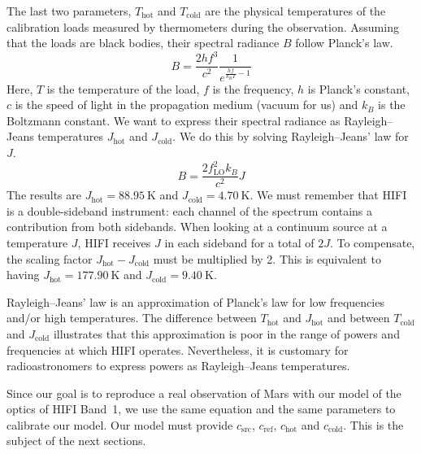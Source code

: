 \begin{refsection}
The last two parameters, $T_\text{hot}$ and $T_\text{cold}$ are the physical temperatures of the calibration loads measured by thermometers during the observation.
Assuming that the loads are black bodies, their spectral radiance $B$ follow Planck's law.
\begin{equation}
    B
    =
    \frac{2 h f^3}{c^2} \frac{1}{e^{\frac{h f}{k_B T} - 1}}
    \label{eq:planck_law}
\end{equation}
Here, $T$ is the temperature of the load, $f$ is the frequency, $h$ is Planck's constant, $c$ is the speed of light in the propagation medium (vacuum for us) and $k_B$ is the Boltzmann constant.
We want to express their spectral radiance as Rayleigh--Jeans temperatures $J_\text{hot}$ and $J_\text{cold}$.
We do this by solving Rayleigh--Jeans' law for $J$.
\begin{equation}
    B
    =
    \frac{2 f_\text{LO}^2 k_B}{c^2}J
    \label{eq:rayleigh_jeans_law}
\end{equation}
The results are $J_\text{hot} = \SI{88.95}{\kelvin}$ and $J_\text{cold} = \SI{4.70}{\kelvin}$.
We must remember that HIFI is a double-sideband instrument: each channel of the spectrum contains a contribution from both sidebands.
When looking at a continuum source at a temperature $J$, HIFI receives $J$ in each sideband for a total of $2J$.
To compensate, the scaling factor $J_\text{hot} - J_\text{cold}$ must be multiplied by 2.
This is equivalent to having $J_\text{hot} = \SI{177.90}{\kelvin}$ and $J_\text{cold}=\SI{9.40}{\kelvin}$.


Rayleigh--Jeans' law is an approximation of Planck's law for low frequencies and/or high temperatures.
The difference between $T_\text{hot}$ and $J_\text{hot}$ and between $T_\text{cold}$ and $J_\text{cold}$ illustrates that this approximation is poor in the range of powers and frequencies at which HIFI operates.
Nevertheless, it is customary for radioastronomers to express powers as Rayleigh--Jeans temperatures.

Since our goal is to reproduce a real observation of Mars with our model of the optics of HIFI Band~1, we use the same equation and the same parameters to calibrate our model.
Our model must provide $c_\text{src}$, $c_\text{ref}$, $c_\text{hot}$ and $c_\text{cold}$.
This is the subject of the next sections.





\end{refsection}
